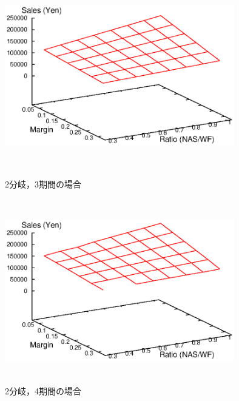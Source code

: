 \documentclass[a4paper,12pt,showkeys]{jreport}
\begin{document}
\begin{figure}[]
 \begin{minipage}{0.5\hsize}
  \begin{center}
   \includegraphics[width=10cm,height=8cm, clip]{stdout_C2_T3_data_m.eps}
  \end{center}
  \caption{2分岐，3期間の場合}
  \label{fig:C2_T3}
 \end{minipage}
 \begin{minipage}{0.5\hsize}
  \begin{center}
   \includegraphics[width=10cm,height=8cm, clip]{stdout_C2_T4_data_m.eps}
  \end{center}
  \caption{2分岐，4期間の場合}
  \label{fig:C2_T4}
 \end{minipage}
\end{figure}
\end{document}

